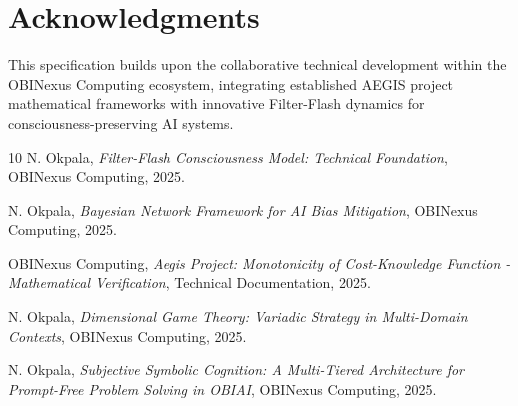 \documentclass[11pt]{article}
\begin{document}
\section{Acknowledgments}

This specification builds upon the collaborative technical development within the OBINexus Computing ecosystem, integrating established AEGIS project mathematical frameworks with innovative Filter-Flash dynamics for consciousness-preserving AI systems.

\begin{thebibliography}{10}
 N. Okpala, \textit{Filter-Flash Consciousness Model: Technical Foundation}, OBINexus Computing, 2025.

 N. Okpala, \textit{Bayesian Network Framework for AI Bias Mitigation}, OBINexus Computing, 2025.

 OBINexus Computing, \textit{Aegis Project: Monotonicity of Cost-Knowledge Function - Mathematical Verification}, Technical Documentation, 2025.

 N. Okpala, \textit{Dimensional Game Theory: Variadic Strategy in Multi-Domain Contexts}, OBINexus Computing, 2025.

 N. Okpala, \textit{Subjective Symbolic Cognition: A Multi-Tiered Architecture for Prompt-Free Problem Solving in OBIAI}, OBINexus Computing, 2025.
\end{thebibliography}
\end{document}
